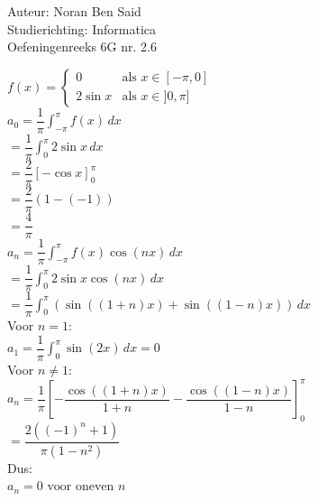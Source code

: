 \documentclass[a4paper]{article}
\begin{document}
  
\noindent \large Auteur: Noran Ben Said \\
\noindent \large Studierichting: Informatica\\
\noindent \large Oefeningenreeks 6G nr. 2.6\\

\medskip

\normalsize

$ f(x) =
\left\{
\begin{array}{ll}
0 & \text{als } x \in [-\pi,0] \\
2\sin x & \text{als } x \in ]0,\pi]
\end{array}
\right.$\\

$ a_0 = \dfrac{1}{\pi}\displaystyle\int_{-\pi}^{\pi} f(x)\,dx$\\

$ = \dfrac{1}{\pi}\displaystyle\int_0^{\pi} 2\sin x\,dx$\\

$ = \dfrac{2}{\pi}\left[-\cos x\right]_0^{\pi}$\\

$ = \dfrac{2}{\pi}(1-(-1))$\\

$ = \dfrac{4}{\pi}$\\

$ a_n = \dfrac{1}{\pi}\displaystyle\int_{-\pi}^{\pi} f(x)\cos(nx)\,dx$\\

$ = \dfrac{1}{\pi}\displaystyle\int_0^{\pi} 2\sin x \cos(nx)\,dx$\\

$ = \dfrac{1}{\pi}\displaystyle\int_0^{\pi}
\left(\sin((1+n)x)+\sin((1-n)x)\right)\,dx$\\


Voor $n=1$:\\

$ a_1 = \dfrac{1}{\pi}\displaystyle\int_0^{\pi}\sin(2x)\,dx = 0$\\

Voor $n\neq1$:\\

$ a_n =
\dfrac{1}{\pi}
\left[
-\dfrac{\cos((1+n)x)}{1+n}
-\dfrac{\cos((1-n)x)}{1-n}
\right]_0^{\pi}$\\

$ =\dfrac{2(( -1)^n+1)}{\pi(1-n^2)}$\\

Dus:\\

$ a_n = 0 \text{ voor oneven } n$\\
\end{document}
